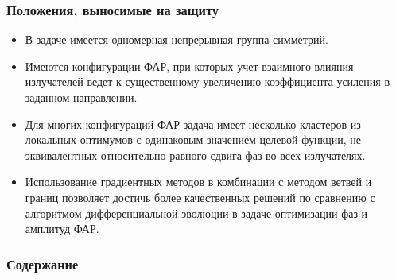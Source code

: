 \begin{frame}
    \setcounter{framenumber}{1}
    \maketitle
\end{frame}

\begin{frame}
    \frametitle{Положения, выносимые на защиту}
    \begin{itemize}
        \item В задаче имеется одномерная непрерывная группа симметрий.
        \item Имеются конфигурации ФАР, при которых учет взаимного влияния излучателей ведет к существенному увеличению коэффициента усиления в заданном направлении.
        \item Для многих конфигураций ФАР задача имеет несколько кластеров из локальных оптимумов с одинаковым значением целевой функции, не эквивалентных относительно равного сдвига фаз во всех излучателях.
        \item Использование градиентных методов в комбинации с методом ветвей и границ позволяет достичь более качественных решений по сравнению с алгоритмом дифференциальной эволюции в задаче оптимизации фаз и амплитуд ФАР.
    \end{itemize}
\end{frame}

\begin{frame}
    \frametitle{Содержание}
    \tableofcontents
\end{frame}
